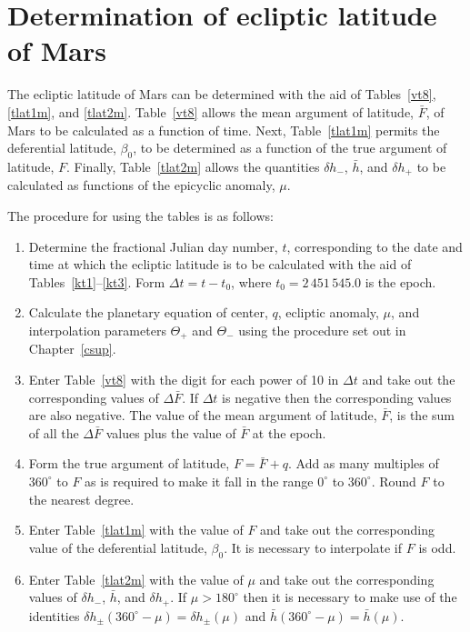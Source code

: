 \section{Determination of ecliptic latitude of Mars}
The ecliptic latitude of Mars can be determined with the aid of Tables~\ref{vt8}, \ref{tlat1m}, and \ref{tlat2m}. Table~\ref{vt8} allows
the mean argument of latitude, $\bar{F}$, of Mars to be calculated as a function of
time. Next, Table~\ref{tlat1m} permits the deferential latitude, $\beta_0$, to
be determined as a function of the true argument of latitude, $F$. Finally, Table~\ref{tlat2m} allows the quantities
$\delta h_-$, $\bar{h}$, and $\delta h_+$ to be calculated as functions of the epicyclic
anomaly, $\mu$. 

The procedure for using the tables is as follows:
\begin{enumerate}

\item Determine the fractional Julian day number, $t$, corresponding to the date and time
at which the ecliptic latitude is to be calculated with the aid of Tables~\ref{kt1}--\ref{kt3}. Form $\Delta t = t-t_0$, where $t_0=2\,451\,545.0$ is the epoch. 

\item Calculate the planetary equation
of center, $q$, ecliptic anomaly, $\mu$, and 
interpolation parameters $\Theta_+$ and $\Theta_-$ using the
procedure set out in Chapter~\ref{csup}.

\item Enter Table~\ref{vt8} with the digit for each power of 10
in ${\Delta} t$ and take out the corresponding values of $\Delta\bar{F}$. If $\Delta t$ is negative then the corresponding
values are also negative.
The value of the mean argument of latitude, $\bar{F}$, is the
sum of all the $\Delta\bar{F}$ values plus the value of $\bar{F}$ at the epoch.  

\item Form the true argument of latitude,
$F=\bar{F} + q$. Add as many multiples of $360^\circ$ to $F$ 
as is required to make it fall in the range $0^\circ$ to $360^\circ$.
Round $F$ to the nearest degree.

\item Enter Table~\ref{tlat1m} with the value of $F$ and take out the
corresponding value of the deferential latitude, $\beta_0$. It is necessary to interpolate if $F$ is odd.

\item Enter Table~\ref{tlat2m} with the value of $\mu$ and take
out the corresponding values of $\delta h_-$, $\bar{h}$, and
$\delta h_+$. If $\mu > 180^\circ$ then it is necessary to make use
of the identities $\delta h_\pm(360^\circ - \mu) = \delta h_\pm(\mu)$
and $\bar{h}(360^\circ - \mu) = \bar{h}(\mu)$.


\end{enumerate}
